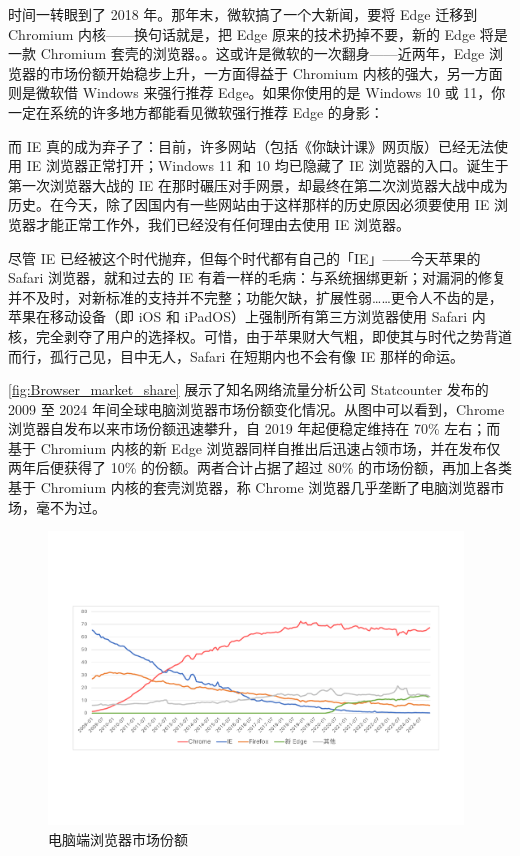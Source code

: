 时间一转眼到了 2018 年。那年末，微软搞了一个大新闻，要将 Edge 迁移到 Chromium 内核——换句话就是，把 Edge 原来的技术扔掉不要，新的 Edge 将是一款 Chromium 套壳的浏览器。。这或许是微软的一次翻身——近两年，Edge 浏览器的市场份额开始稳步上升，一方面得益于 Chromium 内核的强大，另一方面则是微软借 Windows 来强行推荐 Edge。如果你使用的是 Windows 10 或 11，你一定在系统的许多地方都能看见微软强行推荐 Edge 的身影：

而 IE 真的成为弃子了：目前，许多网站（包括《你缺计课》网页版）已经无法使用 IE 浏览器正常打开；Windows 11 和 10 均已隐藏了 IE 浏览器的入口。诞生于第一次浏览器大战的 IE 在那时碾压对手网景，却最终在第二次浏览器大战中成为历史。在今天，除了因国内有一些网站由于这样那样的历史原因必须要使用 IE 浏览器才能正常工作外，我们已经没有任何理由去使用 IE 浏览器。

\begin{note}
  尽管 IE 已经被这个时代抛弃，但每个时代都有自己的「IE」——今天苹果的 Safari 浏览器，就和过去的 IE 有着一样的毛病：与系统捆绑更新；对漏洞的修复并不及时，对新标准的支持并不完整；功能欠缺，扩展性弱……更令人不齿的是，苹果在移动设备（即 iOS 和 iPadOS）上强制所有第三方浏览器使用 Safari 内核，完全剥夺了用户的选择权。可惜，由于苹果财大气粗，即使其与时代之势背道而行，孤行己见，目中无人，Safari 在短期内也不会有像 IE 那样的命运。
\end{note}

\autoref{fig:Browser_market_share} 展示了知名网络流量分析公司 Statcounter 发布的 2009 至 2024 年间全球电脑浏览器市场份额变化情况。从图中可以看到，Chrome 浏览器自发布以来市场份额迅速攀升，自 2019 年起便稳定维持在 70\% 左右；而基于 Chromium 内核的新 Edge 浏览器同样自推出后迅速占领市场，并在发布仅两年后便获得了 10\% 的份额。两者合计占据了超过 80\% 的市场份额，再加上各类基于 Chromium 内核的套壳浏览器，称 Chrome 浏览器几乎垄断了电脑浏览器市场，毫不为过。

\begin{figure}[htb!]
  \centering
  \includegraphics[width=11cm]{assets/software/Browser_market_share.pdf}
  \caption{电脑端浏览器市场份额}
  \label{fig:Browser_market_share}
\end{figure}

